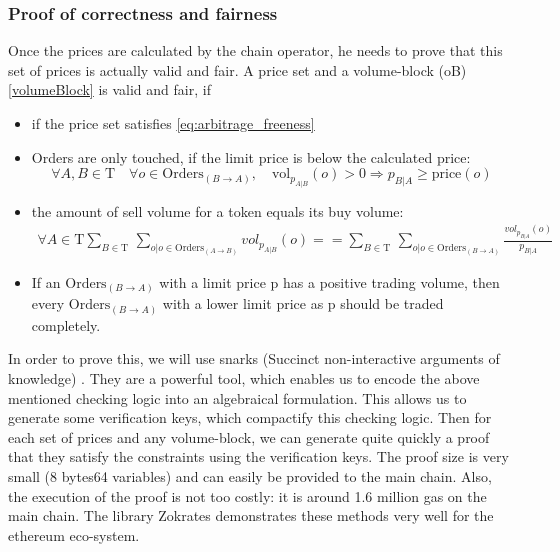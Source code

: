 \documentclass[11pt,parskip=full]{scrartcl}%
\newcommand{\Tau}{\mathrm{T}}
\begin{document}
\subsubsection{Proof of correctness and fairness}
Once the prices are calculated by the chain operator, he needs to prove that this set of prices is actually valid and fair. A  price set and a volume-block (oB) \ref{volumeBlock} is valid and fair, if
\begin{itemize}

\item if the price set satisfies \ref{eq:arbitrage_freeness} 
\item Orders are only touched, if the limit price is below the calculated price:\newline
\begin{equation} \forall A,B \in \Tau \quad \forall o \in \text{Orders}_{(B\rightarrow A)}, \quad \text{vol}_{p_{A|B}}(o)>0 \Rightarrow p_{B|A}\geq \text{price}(o)
\end{equation}
\item the amount of sell volume for a token equals its buy volume: 
\begin{equation}
\begin{split}
\forall A \in \Tau \sum_{B\in \Tau} \,
\sum_{o| o\in \text{Orders}_{(A\rightarrow B)}} vol_{p_{A|B}}(o) == \sum_{B\in \Tau} \, \sum_{o| o\in \text{Orders}_{(B\rightarrow A)}} \frac{vol_{p_{B|A}}(o)}{p_{B|A}}
\end{split}
\end{equation}
\item If an $\text{Orders}_{(B\rightarrow A)}$ with a limit price p has a positive trading volume, then every $\text{Orders}_{(B\rightarrow A)}$ with a lower limit price as p should be traded completely.
\end{itemize}

In order to prove this, we will use snarks (Succinct non-interactive arguments of knowledge) \cite{snarks}. They are a powerful tool, which enables us to encode the above mentioned checking logic into an algebraical formulation. This allows us to generate some verification keys, which compactify this checking logic. Then for each set of prices and any volume-block, we can generate quite quickly a proof that they satisfy the constraints using the verification keys. The proof size is very small (8 bytes64 variables) and can easily be provided to the main chain. Also, the execution of the proof is not too costly: it is around 1.6 million gas on the main chain. The library Zokrates demonstrates these methods very well for the ethereum eco-system.
\end{document}
